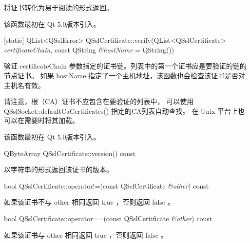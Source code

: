 将证书转化为易于阅读的形式返回。

该函数最初在 Qt 5.0版本引入。

[static] QList<QSslError> QSslCertificate::verify(QList<QSslCertificate> 
\emph{certificateChain}, const QString \emph{\&hostName} = QString())

验证 certificateChain 参数指定的证书链。列表中的第一个证书应是要验证的链的节点证书。
如果 hostName 指定了一个主机地址，该函数也会检查该证书是否对主机名有效。

请注意，根（CA）证书不应包含在要验证的列表中，
可以使用 QSslSocket::defaultCaCertificates() 指定的CA列表自动查找。
在 Unix 平台上也可以在需要时将其加载。

该函数最初在 Qt 5.0版本引入。

QByteArray QSslCertificate::version() const

以字符串的形式返回该证书的版本。

bool QSslCertificate::operator!=(const QSslCertificate \emph{\&other}) const

如果该证书不与 other 相同返回 true ，否则返回 false 。

bool QSslCertificate::operator==(const QSslCertificate \emph{\&other}) const

如果该证书与 other 相同返回 true ，否则返回 false 。